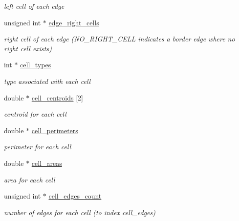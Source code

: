 \begin{DoxyCompactItemize}
\begin{DoxyCompactList}\small\item\em left cell of each edge \item\end{DoxyCompactList}\item 
unsigned int $\ast$ \hyperlink{structFVL_1_1CFVMesh2D_1_1CFVMesh2D__cuda_a0afdfdb2e2d98e52ee797d883dafcf2f}{edge\_\-right\_\-cells}
\begin{DoxyCompactList}\small\item\em right cell of each edge (NO\_\-RIGHT\_\-CELL indicates a border edge where no right cell exists) \item\end{DoxyCompactList}\item 
int $\ast$ \hyperlink{structFVL_1_1CFVMesh2D_1_1CFVMesh2D__cuda_a294a0484d68f983a11a627a5df0a767a}{cell\_\-types}
\begin{DoxyCompactList}\small\item\em type associated with each cell \item\end{DoxyCompactList}\item 
double $\ast$ \hyperlink{structFVL_1_1CFVMesh2D_1_1CFVMesh2D__cuda_a05beb562a8dc14ea92dd8cc7b36f5131}{cell\_\-centroids} \mbox{[}2\mbox{]}
\begin{DoxyCompactList}\small\item\em centroid for each cell \item\end{DoxyCompactList}\item 
double $\ast$ \hyperlink{structFVL_1_1CFVMesh2D_1_1CFVMesh2D__cuda_a05366b974186ac70d633948b29c56384}{cell\_\-perimeters}
\begin{DoxyCompactList}\small\item\em perimeter for each cell \item\end{DoxyCompactList}\item 
double $\ast$ \hyperlink{structFVL_1_1CFVMesh2D_1_1CFVMesh2D__cuda_ae8676892fd56ea5c4828b46ed48c222d}{cell\_\-areas}
\begin{DoxyCompactList}\small\item\em area for each cell \item\end{DoxyCompactList}\item 
unsigned int $\ast$ \hyperlink{structFVL_1_1CFVMesh2D_1_1CFVMesh2D__cuda_a0272dc8071de98dff11b0109af7bdbed}{cell\_\-edges\_\-count}
\begin{DoxyCompactList}\small\item\em number of edges for each cell (to index cell\_\-edges) \item\end{DoxyCompactList}\item 

\end{DoxyCompactItemize}
